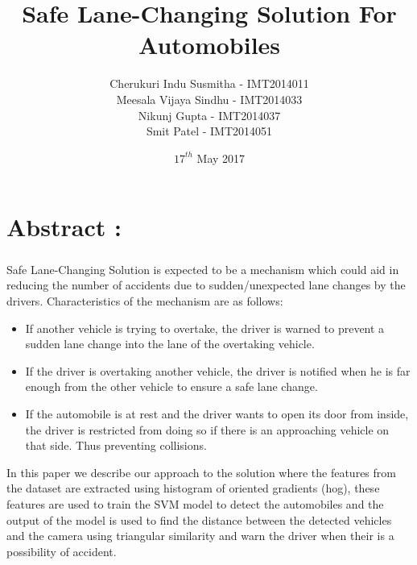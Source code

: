 \documentclass{article}
\title{Safe Lane-Changing Solution For Automobiles}
\date{$17^{th}$ May 2017}
\author{Cherukuri Indu Susmitha - IMT2014011 \\ Meesala Vijaya Sindhu - IMT2014033 \\ Nikunj Gupta - IMT2014037 \\ Smit Patel - IMT2014051}
\begin{document}
	\maketitle
	\section*{Abstract :}
	\subparagraph{}
	Safe Lane-Changing Solution is expected to be a mechanism which could aid in reducing the number of accidents due to sudden/unexpected lane changes by the drivers. Characteristics of the mechanism are as follows:
	\begin{itemize}
	\item If another vehicle is trying to overtake, the driver is warned to prevent a sudden lane change into the lane of the overtaking vehicle.
	\item If the driver is overtaking another vehicle, the driver is notified when he is far enough from the other vehicle to ensure a safe lane change.
	\item If the automobile is at rest and the driver wants to open its door from inside, the driver is restricted from doing so if there is an approaching vehicle on that side. Thus preventing collisions.  
	\end{itemize}		
	In this paper we describe our approach to the solution where the features from  the dataset are extracted using histogram of oriented gradients (hog), these features are used to train the SVM model to detect the automobiles and the output of the model is used to find the distance between the detected vehicles and the camera using triangular similarity and warn the driver when their is a possibility of accident.
\end{document}
